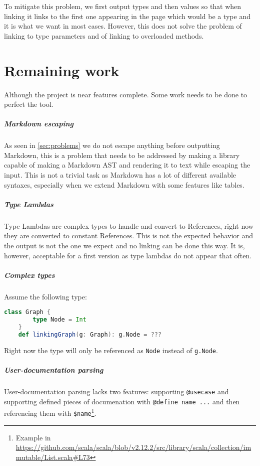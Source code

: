 \documentclass{report}
\begin{document}
To mitigate this problem, we first output types and then values so that when linking it links to the first one appearing in the page which would be a type and it is what we want in most cases. However, this does not solve the problem of linking to type parameters and of linking to overloaded methods.

\chapter{Remaining work}
Although the project is near features complete. Some work needs to be done to perfect the tool.

\paragraph{Markdown escaping}
As seen in \autoref{sec:problems} we do not escape anything before outputting Markdown, this is a problem that needs to be addressed by making a library capable of making a Markdown AST and rendering it to text while escaping the input. This is not a trivial task as Markdown has a lot of different available syntaxes, especially when we extend Markdown with some features like tables.

\paragraph{Type Lambdas}
Type Lambdas are complex types to handle and convert to References, right now they are converted to constant References. This is not the expected behavior and the output is not the one we expect and no linking can be done this way. It is, however, acceptable for a first version as type lambdas do not appear that often.

\paragraph{Complex types}
Assume the following type:
\begin{lstlisting}[language=scala]
    class Graph {
        type Node = Int
    }
    def linkingGraph(g: Graph): g.Node = ???    
\end{lstlisting}
Right now the type will only be referenced as \texttt{Node} instead of \texttt{g.Node}.

\paragraph{User-documentation parsing}
User-documentation parsing lacks two features: supporting \texttt{@usecase} and supporting defined pieces of documenation with \texttt{@define name ...} and then referencing them with \texttt{\$name}\footnote{Example in \url{https://github.com/scala/scala/blob/v2.12.2/src/library/scala/collection/immutable/List.scala\#L73}}.
\end{document}
